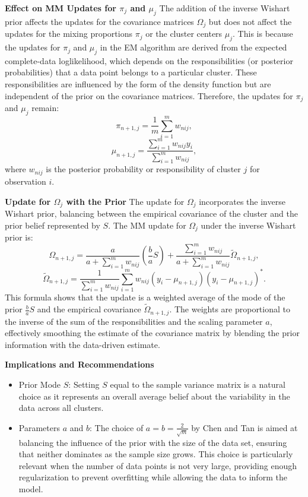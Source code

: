 \documentclass[8pt]{article}
\begin{document}
\textbf{Effect on MM Updates for \(\pi_j\) and \(\mu_j\)}
The addition of the inverse Wishart prior affects the updates for the covariance matrices \(\Omega_j\) but does not affect the updates for the mixing proportions \(\pi_j\) or the cluster centers \(\mu_j\). This is because the updates for \(\pi_j\) and \(\mu_j\) in the EM algorithm are derived from the expected complete-data loglikelihood, which depends on the responsibilities (or posterior probabilities) that a data point belongs to a particular cluster. These responsibilities are influenced by the form of the density function but are independent of the prior on the covariance matrices. Therefore, the updates for \(\pi_j\) and \(\mu_j\) remain:
\[
\pi_{n+1,j} = \frac{1}{m} \sum_{i=1}^m w_{nij},
\]
\[
\mu_{n+1,j} = \frac{\sum_{i=1}^m w_{nij} y_i}{\sum_{i=1}^m w_{nij}},
\]
where \(w_{nij}\) is the posterior probability or responsibility of cluster \(j\) for observation \(i\).

\textbf{Update for \(\Omega_j\) with the Prior}
The update for \(\Omega_j\) incorporates the inverse Wishart prior, balancing between the empirical covariance of the cluster and the prior belief represented by \(S\). The MM update for \(\Omega_j\) under the inverse Wishart prior is:
\[
\Omega_{n+1,j} = \frac{a}{a + \sum_{i=1}^{m} w_{nij}} \left( \frac{b}{a} S \right) + \frac{\sum_{i=1}^{m} w_{nij}}{a + \sum_{i=1}^{m} w_{nij}} \tilde{\Omega}_{n+1,j},
\]
\[
\tilde{\Omega}_{n+1,j} = \frac{1}{\sum_{i=1}^{m} w_{nij}} \sum_{i=1}^{m} w_{nij} (y_i - \mu_{n+1,j})(y_i - \mu_{n+1,j})^*.
\]
This formula shows that the update is a weighted average of the mode of the prior \(\frac{b}{a} S\) and the empirical covariance \(\tilde{\Omega}_{n+1,j}\). The weights are proportional to the inverse of the sum of the responsibilities and the scaling parameter \(a\), effectively smoothing the estimate of the covariance matrix by blending the prior information with the data-driven estimate.

\textbf{Implications and Recommendations}
\begin{itemize}
    \item Prior Mode \(S\): Setting \(S\) equal to the sample variance matrix is a natural choice as it represents an overall average belief about the variability in the data across all clusters.
    \item Parameters \(a\) and \(b\): The choice of \(a = b = \frac{2}{\sqrt{m}}\) by Chen and Tan is aimed at balancing the influence of the prior with the size of the data set, ensuring that neither dominates as the sample size grows. This choice is particularly relevant when the number of data points is not very large, providing enough regularization to prevent overfitting while allowing the data to inform the model.
\end{itemize}
\end{document}

